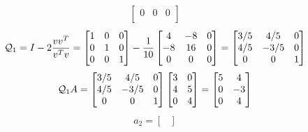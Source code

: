 \documentclass{article}
\begin{document}
\begin{enumerate}
\begin{enumerate}
{\begin{align*}
\begin{bmatrix}
            0 & 0 & 0\\
          \end{bmatrix}
      \end{align*}
      \begin{align*}
        \mathcal{Q}_1 &= I - 2 \frac{vv^T}{v^Tv} 
        = 
        \begin{bmatrix}
        1 & 0 & 0 \\
        0 & 1 & 0 \\
        0 & 0 & 1 \\
        \end{bmatrix} 
        -  \frac{1}{10}
        \begin{bmatrix}
            4 & -8 & 0 \\
            -8 & 16 & 0 \\
            0 & 0 & 0\\
        \end{bmatrix} 
          = 
        \begin{bmatrix}
            3/5 & 4/5 & 0 \\
            4/5 & -3/5 & 0 \\
            0 & 0 & 1\\
        \end{bmatrix} \\
      \end{align*}
      \begin{align*}
          \mathcal{Q}_1 A = 
          \begin{bmatrix}
            3/5 & 4/5 & 0 \\
            4/5 & -3/5 & 0 \\
            0 & 0 & 1\\
        \end{bmatrix} 
        \begin{bmatrix}
            3 & 0 \\
            4 & 5 \\
            0 & 4 \\
        \end{bmatrix}
        = 
        \begin{bmatrix}
            5 & 4 \\
            0 & -3 \\
            0 & 4 \\
        \end{bmatrix}
      \end{align*}
      \begin{align*}
          a_2 = 
          \begin{bmatrix}

\end{bmatrix}
\end{align*}}
\end{enumerate}
\end{enumerate}
\end{document}
